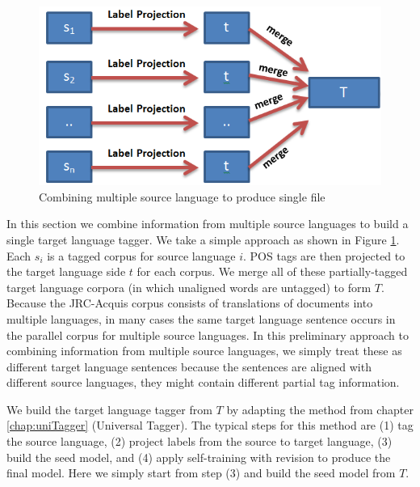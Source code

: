 \begin{figure}
\centering
\includegraphics[scale=0.7]{Figures/multiSource}
\caption{Combining multiple source language to produce single file }
\label{fig:multipleSource}
\end{figure}

In this section we combine information from multiple source languages
to build a single target language tagger. We take a simple approach as shown in Figure \ref{fig:multipleSource}. Each $s_i$ is a
tagged corpus for source language $i$. POS tags are then projected to
the target language side $t$ for each corpus. We merge all of these
partially-tagged target language corpora (in which unaligned words are
untagged) to form $T$. Because the JRC-Acquis corpus consists
  of translations of documents into multiple languages, in many cases
  the same target language sentence occurs in the parallel corpus for
  multiple source languages. In this preliminary approach to combining
  information from multiple source languages, we simply treat these as
  different target language sentences because the sentences are
  aligned with different source languages, they might contain
  different partial tag information.  
  
We build the target language tagger from $T$ by adapting the method from chapter
\ref{chap:uniTagger} (Universal Tagger). The typical steps for this method are (1) tag the source language, (2) project labels from the source to target
language, (3) build the seed model, and (4) apply self-training with
revision to produce the final model. Here we simply start from step
(3) and build the seed model from $T$.

